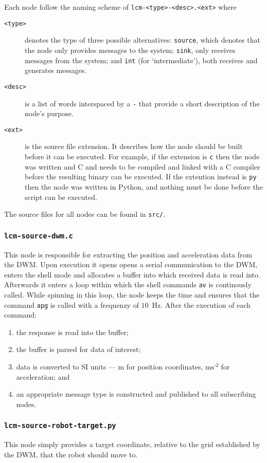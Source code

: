 Each node follow the naming scheme of \texttt{lcm-<type>-<desc>.<ext>} where
\begin{description}
\item[\texttt{<type>}] denotes the type of three possible alternatives:
  \texttt{source}, which denotes that the node only provides messages to the system;
  \texttt{sink}, only receives messages from the system; and
  \texttt{int} (for `intermediate'), both receives and generates messages.
\item[\texttt{<desc>}] is a list of words interspaced by a \texttt{-} that provide a short description of the node's purpose.
\item[\texttt{<ext>}] is the source file extension. It describes how the node should be built before it can be executed.
  For example, if the extension is \texttt{c} then the node was written and C and needs to be compiled and linked with a C compiler before the resulting binary can be executed.
  If the extention instead is \texttt{py} then the node was written in Python, and nothing must be done before the script can be executed.
\end{description}

The source files for all nodes can be found in \texttt{src/}.

\subsubsection{\texttt{lcm-source-dwm.c}}
This node is responsible for extracting the position and acceleration data from the DWM.
Upon execution it opens opens a serial communication to the DWM, enters the shell mode and allocates a buffer into which received data is read into.
Afterwards it enters a loop within which the shell commands \texttt{av} is continously called.
While spinning in this loop, the node keeps the time and ensures that the command \texttt{apg} is called with a frequenzy of $10$~Hz.
After the execution of each command:
\begin{enumerate}
  \item the response is read into the buffer;
  \item the buffer is parsed for data of interest;
  \item data is converted to SI units --- m for position coordinates, $\text{ms}^{\text{-2}}$ for acceleration; and
  \item an appropriate message type is constructed and published to all subscribing nodes.
\end{enumerate}

\subsubsection{\texttt{lcm-source-robot-target.py}}
This node simply provides a target coordinate, relative to the grid established by the DWM, that the robot should move to.
